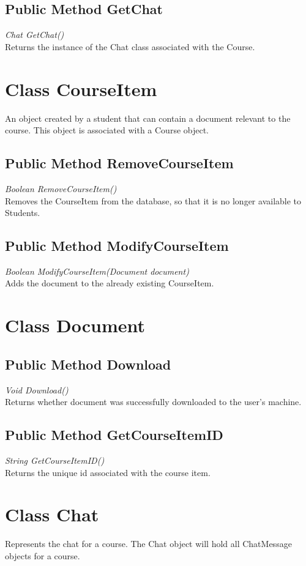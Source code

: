 \documentclass{scrreprt}
\begin{document}
\subsection{Public Method GetChat}
\textit{Chat GetChat()} \\
Returns the instance of the Chat class associated with the Course.

\section{Class CourseItem}
An object created by a student that can contain a document relevant to the course. This object is associated with a Course object.

\subsection{Public Method RemoveCourseItem}
\textit{Boolean RemoveCourseItem()} \\
Removes the CourseItem from the database, so that it is no longer available to Students.

\subsection{Public Method ModifyCourseItem}
\textit{Boolean ModifyCourseItem(Document document)} \\
Adds the document to the already existing CourseItem.

\section{Class Document}

\subsection{Public Method Download}
\textit{Void Download()} \\
Returns whether document was successfully downloaded to the user's machine.

\subsection{Public Method GetCourseItemID}
\textit{String GetCourseItemID()} \\
Returns the unique id associated with the course item.

\section{Class Chat}
Represents the chat for a course. The Chat object will hold all ChatMessage objects for a course.
\end{document}
